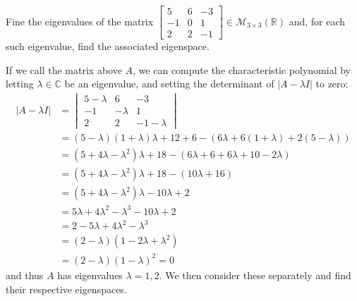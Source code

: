 \documentclass{article}
\begin{document}
\setcounter{section}{12}
\setcounter{problem}{759}
\begin{problem}
Fine the eigenvalues of the matrix
$\begin{bmatrix}
5 & 6 & -3 \\
-1 & 0 & 1 \\
2 & 2 & -1
\end{bmatrix}
\in \mathcal{M}_{3\times 3}(\mathbb{R})$
and, for each such eigenvalue, find the associated eigenspace.
\end{problem}

\begin{solution}
If we call the matrix above $A$, we can compute the characteristic polynomial by letting $\lambda\in\mathbb{C}$ be an eigenvalue, and setting the determinant of $|A-\lambda I|$ to zero:
\begin{align*}
|A-\lambda I| &= 
\begin{vmatrix}
5-\lambda & 6 & -3 \\
-1 & -\lambda & 1 \\
2 & 2 & -1-\lambda
\end{vmatrix}
\\
&= (5-\lambda)(1+\lambda)\lambda +12 +6 -\left( 6\lambda +6(1+\lambda) +2(5-\lambda) \right) \\
&= (5+4\lambda-\lambda^{2})\lambda +18 -\left( 6\lambda +6 +6\lambda +10 -2\lambda \right) \\
&= (5+4\lambda-\lambda^{2})\lambda +18 -( 10\lambda +16 ) \\
&= (5+4\lambda-\lambda^{2})\lambda -10\lambda +2 \\
&= 5\lambda +4\lambda^{2} -\lambda^{3} -10\lambda +2 \\
&= 2 -5\lambda +4\lambda^{2} -\lambda^{3} \\
&= (2-\lambda)(1 -2\lambda +\lambda^{2}) \\
&= (2-\lambda)(1 -\lambda)^{2} = 0
\end{align*}
and thus $A$ has eigenvalues $\lambda = 1,2$. We then consider these separately and find their respective eigenspaces.


\end{solution}
\end{document}
